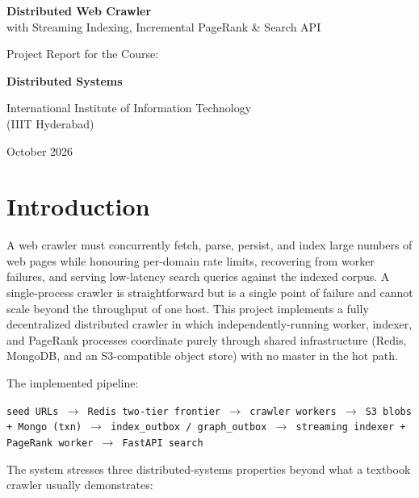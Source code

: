 \documentclass[11pt,a4paper]{article}
\newcommand{\code}[1]{\texttt{#1}}
\begin{document}

\begin{titlepage}
\centering
\vspace*{2.2cm}
{\LARGE \textbf{Distributed Web Crawler}\\[0.3cm]
\large with Streaming Indexing, Incremental PageRank \& Search API\par}
\vspace{0.5cm}
{\large Project Report for the Course:\par}
{\large \textbf{Distributed Systems}\par}
\vfill
{\large International Institute of Information Technology\\(IIIT Hyderabad)\par}
\vspace{0.5cm}
{\large October 2026\par}
\end{titlepage}

\tableofcontents
\newpage
{}

\section{Introduction}

A web crawler must concurrently fetch, parse, persist, and index large numbers of web pages while honouring per-domain rate limits, recovering from worker failures, and serving low-latency search queries against the indexed corpus. A single-process crawler is straightforward but is a single point of failure and cannot scale beyond the throughput of one host. This project implements a fully decentralized distributed crawler in which independently-running worker, indexer, and PageRank processes coordinate purely through shared infrastructure (Redis, MongoDB, and an S3-compatible object store) with no master in the hot path.

The implemented pipeline:

\begin{center}
\code{seed URLs $\to$ Redis two-tier frontier $\to$ crawler workers $\to$ S3 blobs + Mongo (txn) $\to$ index\_outbox / graph\_outbox $\to$ streaming indexer + PageRank worker $\to$ FastAPI search}
\end{center}

The system stresses three distributed-systems properties beyond what a textbook crawler usually demonstrates:
\end{document}
